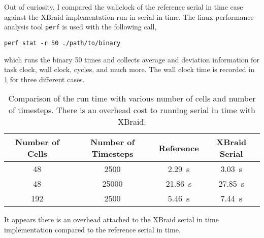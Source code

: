 \documentclass{article}
\begin{document}
Out of curiosity, I compared the wallclock of the reference serial in time case
against the XBraid implementation run in serial in time.
The linux performance analysis tool \texttt{perf} is used with the following
call,
\begin{verbatim}
perf stat -r 50 ./path/to/binary
\end{verbatim}
which runs the binary 50 times and collects average and deviation information
for task clock, wall clock, cycles, and much more.
The wall clock time is recorded in \ref{tbl:serialPerf} for three different cases.
\begin{table}\label{tbl:serialPerf}
  \centering
  \begin{tabular}{c | c | c | c}
    Number of Cells & Number of Timesteps & Reference & XBraid Serial \\
    \hline
    48 & 2500 & \SI{2.29}{\second} & \SI{3.03}{\second} \\
    48 & 25000 & \SI{21.86}{\second} & \SI{27.85}{\second} \\
    192 & 2500 & \SI{5.46}{\second} & \SI{7.44}{\second} \\
  \end{tabular}
  \caption{Comparison of the run time with various number of cells and number of
  timesteps. There is an overhead cost to running serial in time with XBraid.}
\end{table}

It appears there is an overhead attached to the XBraid serial in time implementation compared
to the reference serial in time.
\end{document}
